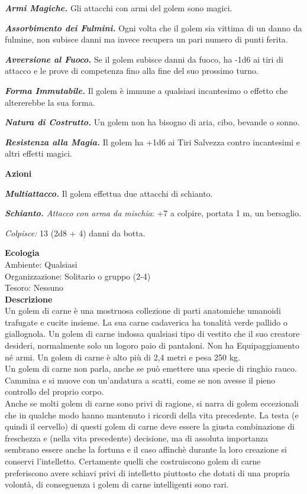 \begin{multicols}{2}
\emph{\textbf{Armi Magiche.}} Gli attacchi con armi del golem sono magici.

\emph{\textbf{Assorbimento dei Fulmini.}} Ogni volta che il golem sia vittima di un danno da fulmine, non subisce danni ma invece recupera un pari numero di punti ferita.

\emph{\textbf{Avversione al Fuoco.}} Se il golem subisce danni da fuoco, ha -1d6 ai tiri di attacco e le prove di competenza fino alla fine del suo prossimo turno.

\emph{\textbf{Forma Immutabile.}} Il golem è immune a qualsiasi incantesimo o effetto che altererebbe la sua forma.

\emph{\textbf{Natura di Costrutto.}} Un golem non ha bisogno di aria, cibo, bevande o sonno.

\emph{\textbf{Resistenza alla Magia.}} Il golem ha +1d6 ai Tiri Salvezza contro incantesimi e altri effetti magici.

\textbf{Azioni}

\emph{\textbf{Multiattacco.}} Il golem effettua due attacchi di
schianto.

\emph{\textbf{Schianto.} Attacco con arma da mischia}: +7 a colpire,
portata 1 m, un bersaglio.

\emph{Colpisce:} 13 (2d8 + 4) danni da botta.

\textbf{Ecologia}\\
Ambiente: Qualsiasi\\
Organizzazione: Solitario o gruppo (2-4)\\
Tesoro: Nessuno\\
\textbf{Descrizione}\\
Un golem di carne è una mostruosa collezione di parti anatomiche umanoidi trafugate e cucite insieme. La sua carne cadaverica ha tonalità verde pallido o giallognola. Un golem di carne indossa qualsiasi tipo di vestito che il suo creatore desideri, normalmente solo un logoro paio di pantaloni. Non ha Equipaggiamento né armi. Un golem di carne è alto più di 2,4 metri e pesa 250 kg.\\

Un golem di carne non parla, anche se può emettere una specie di ringhio rauco. Cammina e si muove con un'andatura a scatti, come se non avesse il pieno controllo del proprio corpo.\\

Anche se molti golem di carne sono privi di ragione, si narra di golem eccezionali che in qualche modo hanno mantenuto i ricordi della vita precedente. La testa (e quindi il cervello) di questi golem di carne deve essere la giusta combinazione di freschezza e (nella vita precedente) decisione, ma di assoluta importanza sembrano essere anche la fortuna e il caso affinchè durante la loro creazione si conservi l'intelletto. Certamente quelli che costruiscono golem di carne preferiscono avere schiavi privi di intelletto piuttosto che dotati di una propria volontà, di conseguenza i golem di carne intelligenti sono rari.\\




\end{multicols}
